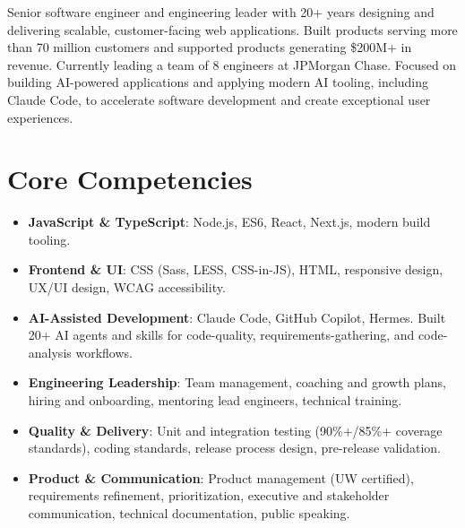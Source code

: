 \documentclass[11pt,a4paper,sans]{moderncv}
\begin{document}
\makecvtitle


\vspace{6pt}
\small{Senior software engineer and engineering leader with 20+ years designing and delivering scalable, customer-facing web applications. Built products serving more than 70 million customers and supported products generating \$200M+ in revenue. Currently leading a team of 8 engineers at JPMorgan Chase. Focused on building AI-powered applications and applying modern AI tooling, including Claude Code, to accelerate software development and create exceptional user experiences.}


\section{Core Competencies}
\vspace{1pt}
\begin{itemize}

\item \textbf{JavaScript \& TypeScript}: Node.js, ES6, React, Next.js, modern build tooling.

\item \textbf{Frontend \& UI}: CSS (Sass, LESS, CSS-in-JS), HTML, responsive design, UX/UI design, WCAG accessibility.

\item \textbf{AI-Assisted Development}: Claude Code, GitHub Copilot, Hermes. Built 20+ AI agents and skills for code-quality, requirements-gathering, and code-analysis workflows.

\item \textbf{Engineering Leadership}: Team management, coaching and growth plans, hiring and onboarding, mentoring lead engineers, technical training.

\item \textbf{Quality \& Delivery}: Unit and integration testing (90\%+/85\%+ coverage standards), coding standards, release process design, pre-release validation.

\item \textbf{Product \& Communication}: Product management (UW certified), requirements refinement, prioritization, executive and stakeholder communication, technical documentation, public speaking.

\end{itemize}
\end{document}

